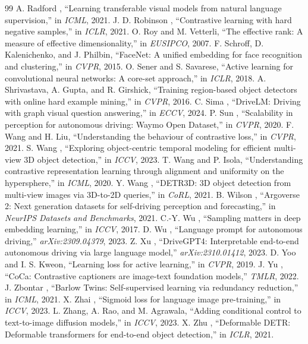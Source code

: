\documentclass[10pt,twocolumn,letterpaper]{article}
\begin{document}
\begin{thebibliography}{99}
 A. Radford \etal, ``Learning transferable visual models from natural language supervision,'' in \emph{ICML}, 2021.
 J. D. Robinson \etal, ``Contrastive learning with hard negative samples,'' in \emph{ICLR}, 2021.
 O. Roy and M. Vetterli, ``The effective rank: A measure of effective dimensionality,'' in \emph{EUSIPCO}, 2007.
 F. Schroff, D. Kalenichenko, and J. Philbin, ``FaceNet: A unified embedding for face recognition and clustering,'' in \emph{CVPR}, 2015.
 O. Sener and S. Savarese, ``Active learning for convolutional neural networks: A core-set approach,'' in \emph{ICLR}, 2018.
 A. Shrivastava, A. Gupta, and R. Girshick, ``Training region-based object detectors with online hard example mining,'' in \emph{CVPR}, 2016.
 C. Sima \etal, ``DriveLM: Driving with graph visual question answering,'' in \emph{ECCV}, 2024.
 P. Sun \etal, ``Scalability in perception for autonomous driving: Waymo Open Dataset,'' in \emph{CVPR}, 2020.
 F. Wang and H. Liu, ``Understanding the behaviour of contrastive loss,'' in \emph{CVPR}, 2021.
 S. Wang \etal, ``Exploring object-centric temporal modeling for efficient multi-view 3D object detection,'' in \emph{ICCV}, 2023.
 T. Wang and P. Isola, ``Understanding contrastive representation learning through alignment and uniformity on the hypersphere,'' in \emph{ICML}, 2020.
 Y. Wang \etal, ``DETR3D: 3D object detection from multi-view images via 3D-to-2D queries,'' in \emph{CoRL}, 2021.
 B. Wilson \etal, ``Argoverse 2: Next generation datasets for self-driving perception and forecasting,'' in \emph{NeurIPS Datasets and Benchmarks}, 2021.
 C.-Y. Wu \etal, ``Sampling matters in deep embedding learning,'' in \emph{ICCV}, 2017.
 D. Wu \etal, ``Language prompt for autonomous driving,'' \emph{arXiv:2309.04379}, 2023.
 Z. Xu \etal, ``DriveGPT4: Interpretable end-to-end autonomous driving via large language model,'' \emph{arXiv:2310.01412}, 2023.
 D. Yoo and I. S. Kweon, ``Learning loss for active learning,'' in \emph{CVPR}, 2019.
 J. Yu \etal, ``CoCa: Contrastive captioners are image-text foundation models,'' \emph{TMLR}, 2022.
 J. Zbontar \etal, ``Barlow Twins: Self-supervised learning via redundancy reduction,'' in \emph{ICML}, 2021.
 X. Zhai \etal, ``Sigmoid loss for language image pre-training,'' in \emph{ICCV}, 2023.
 L. Zhang, A. Rao, and M. Agrawala, ``Adding conditional control to text-to-image diffusion models,'' in \emph{ICCV}, 2023.
 X. Zhu \etal, ``Deformable DETR: Deformable transformers for end-to-end object detection,'' in \emph{ICLR}, 2021.
\end{thebibliography}
\end{document}
